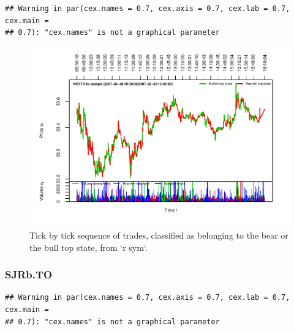 \documentclass[]{article}
\begin{document}
\begin{verbatim}
## Warning in par(cex.names = 0.7, cex.axis = 0.7, cex.lab = 0.7, cex.main =
## 0.7): "cex.names" is not a graphical parameter
\end{verbatim}

\begin{figure}[H]
\includegraphics[width=\textwidth]{main_files/figure-latex/unnamed-chunk-40-1} \caption{Tick by tick sequence of trades, classified as belonging to the bear or the bull top state, from `r sym`.}\label{fig:unnamed-chunk-40}
\end{figure}

\newpage

\subsubsection{SJRb.TO}\label{sjrb.to}

\begin{verbatim}
## Warning in par(cex.names = 0.7, cex.axis = 0.7, cex.lab = 0.7, cex.main =
## 0.7): "cex.names" is not a graphical parameter
\end{verbatim}
\end{document}
